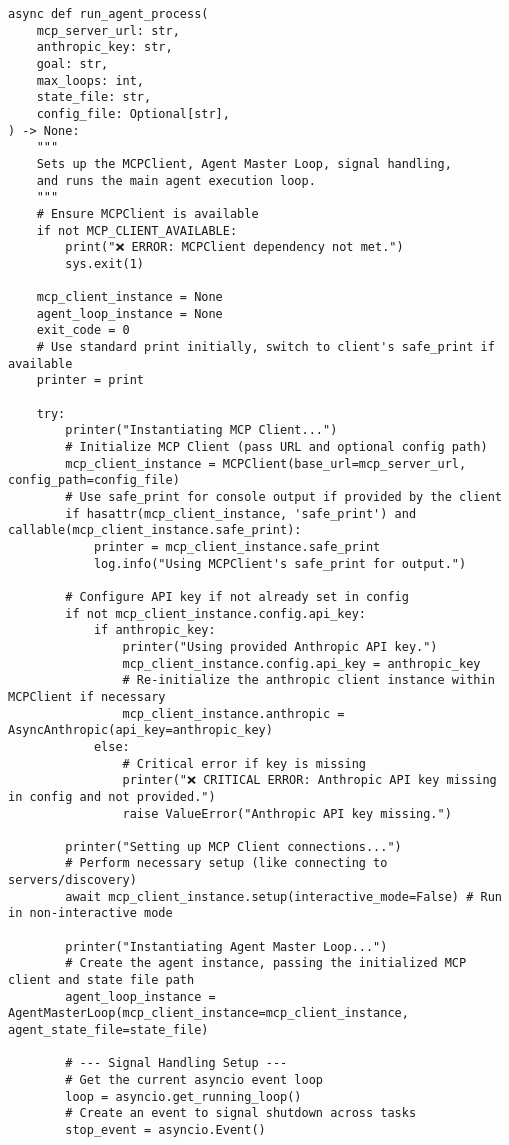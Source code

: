 \documentclass[12pt,a4paper]{article}
\begin{document}
\begin{pageablecode}
\begin{verbatim}
async def run_agent_process(
    mcp_server_url: str,
    anthropic_key: str,
    goal: str,
    max_loops: int,
    state_file: str,
    config_file: Optional[str],
) -> None:
    """
    Sets up the MCPClient, Agent Master Loop, signal handling,
    and runs the main agent execution loop.
    """
    # Ensure MCPClient is available
    if not MCP_CLIENT_AVAILABLE:
        print("❌ ERROR: MCPClient dependency not met.")
        sys.exit(1)

    mcp_client_instance = None
    agent_loop_instance = None
    exit_code = 0
    # Use standard print initially, switch to client's safe_print if available
    printer = print

    try:
        printer("Instantiating MCP Client...")
        # Initialize MCP Client (pass URL and optional config path)
        mcp_client_instance = MCPClient(base_url=mcp_server_url, config_path=config_file)
        # Use safe_print for console output if provided by the client
        if hasattr(mcp_client_instance, 'safe_print') and callable(mcp_client_instance.safe_print):
            printer = mcp_client_instance.safe_print
            log.info("Using MCPClient's safe_print for output.")

        # Configure API key if not already set in config
        if not mcp_client_instance.config.api_key:
            if anthropic_key:
                printer("Using provided Anthropic API key.")
                mcp_client_instance.config.api_key = anthropic_key
                # Re-initialize the anthropic client instance within MCPClient if necessary
                mcp_client_instance.anthropic = AsyncAnthropic(api_key=anthropic_key)
            else:
                # Critical error if key is missing
                printer("❌ CRITICAL ERROR: Anthropic API key missing in config and not provided.")
                raise ValueError("Anthropic API key missing.")

        printer("Setting up MCP Client connections...")
        # Perform necessary setup (like connecting to servers/discovery)
        await mcp_client_instance.setup(interactive_mode=False) # Run in non-interactive mode

        printer("Instantiating Agent Master Loop...")
        # Create the agent instance, passing the initialized MCP client and state file path
        agent_loop_instance = AgentMasterLoop(mcp_client_instance=mcp_client_instance, agent_state_file=state_file)

        # --- Signal Handling Setup ---
        # Get the current asyncio event loop
        loop = asyncio.get_running_loop()
        # Create an event to signal shutdown across tasks
        stop_event = asyncio.Event()


\end{verbatim}
\end{pageablecode}
\end{document}
